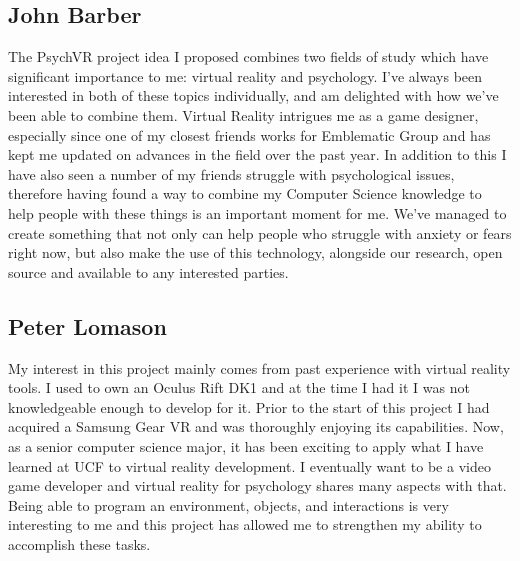 \documentclass[a4paper,10pt]{article}
\begin{document}
	\subsection{John Barber}
	The PsychVR project idea I proposed combines two fields of study which have significant importance to me: virtual reality and psychology. I've always been interested in both of these topics individually, and am delighted with how we’ve been able to combine them. Virtual Reality intrigues me as a game designer, especially since one of my closest friends works for Emblematic Group and has kept me updated on advances in the field over the past year. In addition to this I have also seen a number of my friends struggle with psychological issues, therefore having found a way to combine my Computer Science knowledge to help people with these things is an important moment for me. We’ve managed to create something that not only can help people who struggle with anxiety or fears right now, but also make the use of this technology, alongside our research, open source and available to any interested parties.
	
	\subsection{Peter Lomason}
	My interest in this project mainly comes from past experience with virtual reality tools. I used to own an Oculus Rift DK1 and at the time I had it I was not knowledgeable enough to develop for it. Prior to the start of this project I had acquired a Samsung Gear VR and was thoroughly enjoying its capabilities. Now, as a senior computer science major, it has been exciting to apply what I have learned at UCF to virtual reality development. I eventually want to be a video game developer and virtual reality for psychology shares many aspects with that. Being able to program an environment, objects, and interactions is very interesting to me and this project has allowed me to strengthen my ability to accomplish these tasks.
	
\pagebreak




\end{document}
